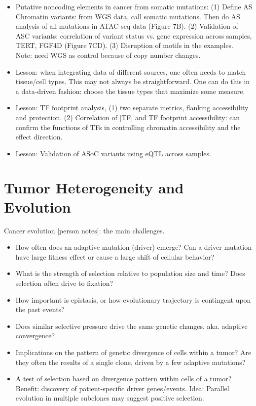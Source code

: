 \documentclass{report}
\begin{document}
\begin{itemize}
	\item Putative noncoding elements in cancer from somatic mutations: (1) Define AS Chromatin variants: from WGS data, call somatic mutations. Then do AS analysis of all mutations in ATAC-seq data (Figure 7B). (2) Validation of ASC variants: correlation of variant status vs. gene expression across samples, TERT, FGF4D (Figure 7CD). (3) Disruption of motifs in the examples.\\
	Note: need WGS as control because of copy number changes. 
	
	\item Lesson: when integrating data of different sources, one often needs to match tissue/cell types. This may not always be straightforward. One can do this in a data-driven fashion: choose the tissue types that maximize some measure.
	
	\item Lesson: TF footprint analysis, (1) two separate metrics, flanking accessibility and protection. (2) Correlation of [TF] and TF footprint accessibility: can confirm the functions of TFs in controlling chromatin accessibility and the effect direction.
	
	\item Lesson: Validation of ASoC variants using eQTL across samples.
\end{itemize}
\chapter{Tumor Heterogeneity and Evolution}

Cancer evolution [person notes]: the main challenges.
\begin{itemize}
	
	\item How often does an adaptive mutation (driver) emerge? Can a driver mutation have large fitness effect or cause a large shift of cellular behavior?
	
	\item What is the strength of selection relative to population size and time? Does selection often drive to fixation?
	
	\item How important is epistasis, or how evolutionary trajectory is contingent upon the past events?
	
	\item Does similar selective pressure drive the same genetic changes, aka. adaptive convergence?
	
	\item Implications on the pattern of genetic divergence of cells within a tumor? Are they often the results of a single clone, driven by a few adaptive mutations?
	
	\item A test of selection based on divergence pattern within cells of a tumor? Benefit: discovery of patient-specific driver genes/events. Idea: Parallel evolution in multiple subclones may suggest positive selection.  
\end{itemize}
\end{document}
